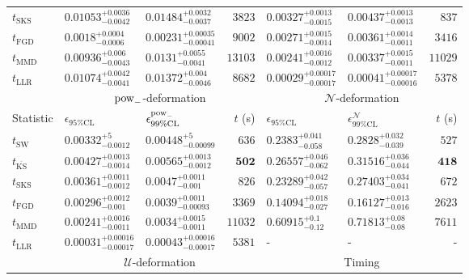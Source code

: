 \begin{tabular}{l|llr|llr}
	$t_{\mathrm{SKS}}$ & $0.01053_{-0.0042}^{+0.0036}$ & $0.01484_{-0.0037}^{+0.0032}$ & $3823$ & $0.00327_{-0.0015}^{+0.0013}$ & $0.00437_{-0.0013}^{+0.0013}$ & $837$ \\
	$t_{\mathrm{FGD}}$ & ${\mathbf{0.0018_{-0.0006}^{+0.0004}}}$ & ${\mathbf{0.00231_{-0.00041}^{+0.00035}}}$ & $9002$ & $0.00271_{-0.0014}^{+0.0015}$ & $0.00361_{-0.0011}^{+0.0014}$ & $3416$ \\
	$t_{\mathrm{MMD}}$ & $0.00936_{-0.0043}^{+0.006}$ & $0.0131_{-0.0041}^{+0.0055}$ & $13103$ & ${\mathbf{0.00241_{-0.0012}^{+0.0016}}}$ & ${\mathbf{0.00337_{-0.0011}^{+0.0015}}}$ & $11029$ \\
	$t_{\mathrm{LLR}}$ & $0.01074_{-0.0041}^{+0.0042}$ & $0.01372_{-0.0046}^{+0.004}$ & $8682$ & $0.00029_{-0.00017}^{+0.00017}$ & $0.00041_{-0.00016}^{+0.00017}$ & $5378$ \\
	\toprule
	\multicolumn{1}{c}{} & \multicolumn{3}{c}{$\rm{pow}_{-}$-deformation} & \multicolumn{3}{c}{$\mathcal{N}$-deformation} \\
	Statistic & $\epsilon_{95\%\mathrm{CL}}$ & $\epsilon^  {\rm{pow}_{-}}_{99\%\mathrm{CL}}$ & $t$ (s) & $\epsilon_{95\%\mathrm{CL}}$ & $\epsilon^    {\mathcal{N}}_{99\%\mathrm{CL}}$ & $t$ (s) \\
	\midrule
	$t_{\mathrm{SW}}$ & $0.00332_{-0.0012}^{+5}$ & $0.00448_{-0.00099}^{+5}$ & $636$ & $0.2383_{-0.058}^{+0.041}$ & $0.2828_{-0.039}^{+0.032}$ & $527$ \\
	$t_{\overline{\mathrm{KS}}}$ & $0.00427_{-0.0014}^{+0.0013}$ & $0.00565_{-0.0012}^{+0.0013}$ & ${\mathbf{502}}$ & $0.26557_{-0.062}^{+0.046}$ & $0.31516_{-0.044}^{+0.036}$ & ${\mathbf{418}}$ \\
	$t_{\mathrm{SKS}}$ & $0.00361_{-0.0012}^{+0.0011}$ & $0.0047_{-0.001}^{+0.0011}$ & $826$ & $0.23289_{-0.057}^{+0.042}$ & $0.27403_{-0.041}^{+0.034}$ & $672$ \\
	$t_{\mathrm{FGD}}$ & $0.00296_{-0.001}^{+0.0012}$ & $0.0039_{-0.00093}^{+0.0011}$ & $3369$ & ${\mathbf{0.14094_{-0.027}^{+0.018}}}$ & ${\mathbf{0.16127_{-0.016}^{+0.013}}}$ & $2623$ \\
	$t_{\mathrm{MMD}}$ & ${\mathbf{0.00241_{-0.0011}^{+0.0016}}}$ & ${\mathbf{0.0034_{-0.0011}^{+0.0015}}}$ & $11032$ & $0.60915_{-0.12}^{+0.1}$ & $0.71813_{-0.08}^{+0.08}$ & $7611$ \\
	$t_{\mathrm{LLR}}$ & $0.00031_{-0.00017}^{+0.00016}$ & $0.00043_{-0.00017}^{+0.00016}$ & $5381$ & - & - & - \\
	\toprule
	\multicolumn{1}{c}{} & \multicolumn{3}{c}{$\mathcal{U}$-deformation} & \multicolumn{3}{c}{Timing} \\

\end{tabular}
